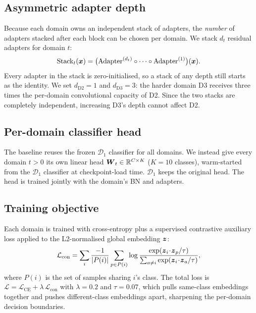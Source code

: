 \documentclass[9pt,conference]{IEEEtran}
\newcommand{\symvec}[1]{{\mbox{\boldmath $#1$}}}
\begin{document}
\subsection{Asymmetric adapter depth}
\label{ssec:asym}

Because each domain owns an independent stack of adapters, the
\emph{number} of adapters stacked after each block can be chosen per
domain. We stack $d_t$ residual adapters for domain $t$:
\begin{equation}
  \label{eqn:stack}
  \mathrm{Stack}_t(\symvec{x}) =
    \big(\mathrm{Adapter}^{(d_t)} \circ \cdots \circ
         \mathrm{Adapter}^{(1)}\big)(\symvec{x}).
\end{equation}
Every adapter in the stack is zero-initialised, so a stack of any depth
still starts as the identity. We set $d_{\mathrm{D2}}=1$ and
$d_{\mathrm{D3}}=3$: the harder domain D3 receives three times the
per-domain convolutional capacity of D2. Since the two stacks are
completely independent, increasing D3's depth cannot affect D2.

\subsection{Per-domain classifier head}
\label{ssec:head}

The baseline reuses the frozen $\mathcal{D}_1$ classifier for all domains.
We instead give every domain $t>0$ its own linear head
$\symvec{W}_t\in\mathbb{R}^{C\times K}$ ($K=10$ classes), warm-started from
the $\mathcal{D}_1$ classifier at checkpoint-load time. $\mathcal{D}_1$
keeps the original head. The head is trained jointly with the domain's BN
and adapters.

\subsection{Training objective}
\label{ssec:loss}

Each domain is trained with cross-entropy plus a supervised contrastive
auxiliary loss \cite{khosla2020supcon} applied to the L2-normalised global
embedding $\symvec{z}$:
\begin{equation}
  \label{eqn:supcon}
  \mathcal{L}_{\mathrm{con}} =
    \sum_{i}\frac{-1}{|P(i)|}\sum_{p\in P(i)}
      \log\frac{\exp(\symvec{z}_i\!\cdot\!\symvec{z}_p/\tau)}
               {\sum_{a\neq i}\exp(\symvec{z}_i\!\cdot\!\symvec{z}_a/\tau)},
\end{equation}
where $P(i)$ is the set of samples sharing $i$'s class. The total loss is
$\mathcal{L} = \mathcal{L}_{\mathrm{CE}} +
\lambda\,\mathcal{L}_{\mathrm{con}}$ with $\lambda=0.2$ and $\tau=0.07$,
which pulls same-class embeddings together and pushes different-class
embeddings apart, sharpening the per-domain decision boundaries.
\end{document}
